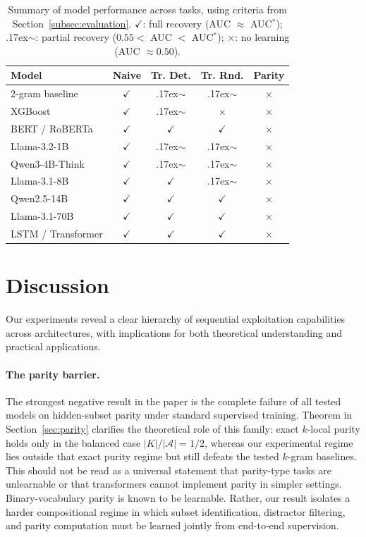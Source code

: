\documentclass{article}
\newcommand{\cmark}{\checkmark}
\newcommand{\xmark}{\times}
\theoremstyle{plain}
\theoremstyle{definition}
\theoremstyle{remark}
\begin{document}
\begin{table}[t]
\centering
\caption{Summary of model performance across tasks, using criteria from Section~\ref{subsec:evaluation}. $\cmark$: full recovery (AUC $\approx$ AUC$^*$); {\raise.17ex\hbox{$\scriptstyle\sim$}}: partial recovery ($0.55 <$ AUC $<$ AUC$^*$); $\xmark$: no learning (AUC $\approx 0.50$).}
\label{tab:results_summary}
\small
\begin{tabular}{@{}lcccc@{}}
\toprule
Model & Naive & Tr. Det. & Tr. Rnd. & Parity \\
\midrule
2-gram baseline & $\cmark$ & {\raise.17ex\hbox{$\scriptstyle\sim$}} & {\raise.17ex\hbox{$\scriptstyle\sim$}} & $\xmark$ \\
XGBoost & $\cmark$ & {\raise.17ex\hbox{$\scriptstyle\sim$}} & $\xmark$ & $\xmark$ \\
BERT / RoBERTa & $\cmark$ & $\cmark$ & $\cmark$ & $\xmark$ \\
Llama-3.2-1B & $\cmark$ & {\raise.17ex\hbox{$\scriptstyle\sim$}} & {\raise.17ex\hbox{$\scriptstyle\sim$}} & $\xmark$ \\
Qwen3-4B-Think & $\cmark$ & {\raise.17ex\hbox{$\scriptstyle\sim$}} & {\raise.17ex\hbox{$\scriptstyle\sim$}} & $\xmark$ \\
Llama-3.1-8B & $\cmark$ & $\cmark$ & {\raise.17ex\hbox{$\scriptstyle\sim$}} & $\xmark$ \\
Qwen2.5-14B & $\cmark$ & $\cmark$& $\cmark$ & $\xmark$ \\
Llama-3.1-70B & $\cmark$ & $\cmark$ & $\cmark$ & $\xmark$ \\
LSTM / Transformer & $\cmark$ & $\cmark$ & $\cmark$ & $\xmark$ \\
\bottomrule
\end{tabular}
\end{table}

\section{Discussion}
\label{sec:discussion}

Our experiments reveal a clear hierarchy of sequential exploitation capabilities across architectures, with implications for both theoretical understanding and practical applications.

\paragraph{The parity barrier.}
The strongest negative result in the paper is the complete failure of all tested models on hidden-subset parity under standard supervised training. Theorem in Section~\ref{sec:parity} clarifies the theoretical role of this family: exact $k$-local purity holds only in the balanced case $|K|/|\mathcal{A}|=1/2$, whereas our experimental regime lies outside that exact purity regime but still defeats the tested $k$-gram baselines. This should not be read as a universal statement that parity-type tasks are unlearnable or that transformers cannot implement parity in simpler settings. Binary-vocabulary parity is known to be learnable. Rather, our result isolates a harder compositional regime in which subset identification, distractor filtering, and parity computation must be learned jointly from end-to-end supervision.
\end{document}
